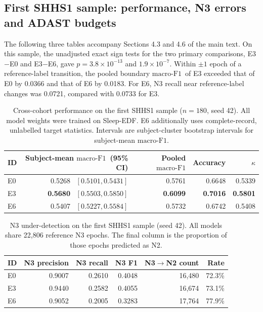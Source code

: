 \documentclass[10pt,a4paper]{article}
\newcommand{\mf}{\ensuremath{\mathrm{macro\text{-}F1}}}
\newcommand{\ci}{95\% CI}
\begin{document}
\subsection*{First SHHS1 sample: performance, N3 errors and ADAST budgets}

The following three tables accompany Sections 4.3 and 4.6 of the main text.
On this sample, the unadjusted exact sign tests for the two primary comparisons, E3$-$E0 and E3$-$E6, gave
$p = 3.8\times10^{-13}$ and $1.9\times10^{-7}$. Within $\pm1$ epoch of a reference-label transition, the
pooled boundary \mf\ of E3 exceeded that of E0 by 0.0366 and that of E6 by 0.0183. For E6, N3 recall
near reference-label changes was 0.0721, compared with 0.0733 for E3.

\begin{table}[H]
\centering
\caption{Cross-cohort performance on the first SHHS1 sample ($n=180$, seed 42). All model weights were
trained on Sleep-EDF. E6 additionally uses complete-record, unlabelled target statistics.
Intervals are subject-cluster bootstrap intervals for subject-mean \mf.}
\label{tab:sup_first_performance}
\small
\begin{tabular}{lrrrr}
\toprule
\textbf{ID} & \textbf{Subject-mean \mf\ (\ci)} & \textbf{Pooled \mf} & \textbf{Accuracy} & \textbf{$\kappa$} \\
\midrule
E0 & 0.5268 \ $[0.5101, 0.5431]$ & 0.5761 & 0.6648 & 0.5339 \\
E3 & \textbf{0.5680} \ $\boldsymbol{[0.5503, 0.5850]}$ & \textbf{0.6099} & \textbf{0.7016} & \textbf{0.5801} \\
E6 & 0.5407 \ $[0.5227, 0.5584]$ & 0.5732 & 0.6742 & 0.5408 \\
\bottomrule
\end{tabular}
\end{table}

\begin{table}[H]
\centering\small
\caption{N3 under-detection on the first SHHS1 sample (seed 42). All models share 22{,}806 reference
N3 epochs. The final column is the proportion of those epochs predicted as N2.}
\label{tab:sup_first_n3}
\begin{tabular}{lrrrrr}
\toprule
\textbf{ID} & \textbf{N3 precision} & \textbf{N3 recall} & \textbf{N3 F1} & \textbf{N3$\to$N2 count} & \textbf{Rate} \\
\midrule
E0 & 0.9007 & 0.2610 & 0.4048 & 16{,}480 & 72.3\% \\
E3 & 0.9440 & 0.2582 & 0.4055 & 16{,}674 & 73.1\% \\
E6 & 0.9052 & 0.2005 & 0.3283 & 17{,}764 & 77.9\% \\
\bottomrule
\end{tabular}
\end{table}
\end{document}
